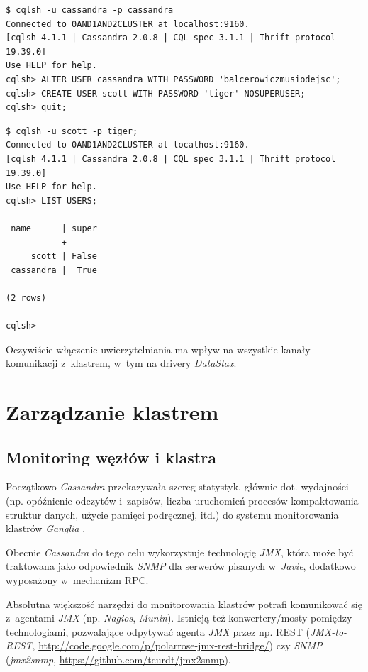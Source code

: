 \documentclass{article} %
\begin{document}
\begin{lstlisting}[style=bash, caption={konfiguracja kont użytkowników}]
$ cqlsh -u cassandra -p cassandra
Connected to 0AND1AND2CLUSTER at localhost:9160.
[cqlsh 4.1.1 | Cassandra 2.0.8 | CQL spec 3.1.1 | Thrift protocol 19.39.0]
Use HELP for help.
cqlsh> ALTER USER cassandra WITH PASSWORD 'balcerowiczmusiodejsc';
cqlsh> CREATE USER scott WITH PASSWORD 'tiger' NOSUPERUSER;
cqlsh> quit;
\end{lstlisting}

\pagebreak

\begin{lstlisting}[style=bash, caption={weryfikacja konfiguracji kont użytkowników}]
$ cqlsh -u scott -p tiger;
Connected to 0AND1AND2CLUSTER at localhost:9160.
[cqlsh 4.1.1 | Cassandra 2.0.8 | CQL spec 3.1.1 | Thrift protocol 19.39.0]
Use HELP for help.
cqlsh> LIST USERS;

 name      | super
-----------+-------
     scott | False
 cassandra |  True

(2 rows)

cqlsh>
\end{lstlisting}

Oczywiście włączenie uwierzytelniania ma wpływ na wszystkie kanały komunikacji z~klastrem, w~tym na drivery \emph{DataStax}.

\section{Zarządzanie klastrem}\label{sec:management}

\subsection{Monitoring węzłów i klastra}\label{sec:management_monitoring}

Początkowo \emph{Cassandra} przekazywała szereg statystyk, głównie dot. wydajności (np. opóźnienie odczytów i~zapisów, liczba uruchomień procesów kompaktowania struktur danych, użycie pamięci podręcznej, itd.) do systemu monitorowania klastrów \emph{Ganglia} \cite{facebook_paper} \cite{ganglia}.

Obecnie \emph{Cassandra} do tego celu wykorzystuje technologię \emph{JMX}, która może być traktowana jako odpowiednik \emph{SNMP} dla serwerów pisanych w~\emph{Javie}, dodatkowo wyposażony w~mechanizm RPC.

Absolutna większość narzędzi do monitorowania klastrów potrafi komunikować się z~agentami \emph{JMX} (np. \emph{Nagios}, \emph{Munin}).
Istnieją też konwertery/mosty pomiędzy technologiami, pozwalające odpytywać agenta \emph{JMX} przez np. REST (\emph{JMX-to-REST}, \url{http://code.google.com/p/polarrose-jmx-rest-bridge/}) czy \emph{SNMP} (\emph{jmx2snmp}, \url{https://github.com/tcurdt/jmx2snmp}).
\end{document}
